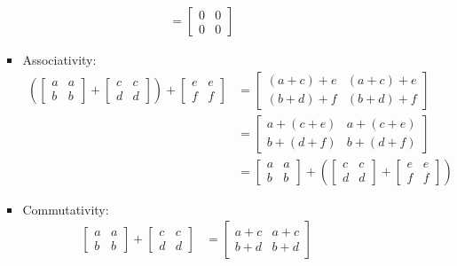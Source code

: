 \documentclass[11pt]{article}
\begin{document}
\begin{enumerate}
\begin{enumerate}
\begin{description}
\begin{itemize}
\begin{align*}
                            &= \begin{bmatrix}0&0\\0&0\end{bmatrix}
          \end{align*}
        \item Associativity:
          \begin{align*}
            \left(\begin{bmatrix}a&a\\b&b\end{bmatrix} + \begin{bmatrix}c&c\\d&d\end{bmatrix}\right) + \begin{bmatrix}e&e\\f&f\end{bmatrix} &= \begin{bmatrix}(a+c)+e & (a+c)+e\\(b+d)+f & (b+d)+f\end{bmatrix}\\
                                  &= \begin{bmatrix}a+(c+e) & a+(c+e)\\b+(d+f) & b+(d+f)\end{bmatrix}\\
                                  &= \begin{bmatrix}a&a\\b&b\end{bmatrix} + \left( \begin{bmatrix}c&c\\d&d\end{bmatrix} + \begin{bmatrix}e&e\\f&f\end{bmatrix}\right)
          \end{align*}
        \item Commutativity:
          \begin{align*}
            \begin{bmatrix}a&a\\b&b\end{bmatrix} + \begin{bmatrix}c&c\\d&d\end{bmatrix} &= \begin{bmatrix}a+c&a+c\\b+d&b+d\end{bmatrix}\\

\end{align*}
\end{itemize}
\end{description}
\end{enumerate}
\end{enumerate}
\end{document}
